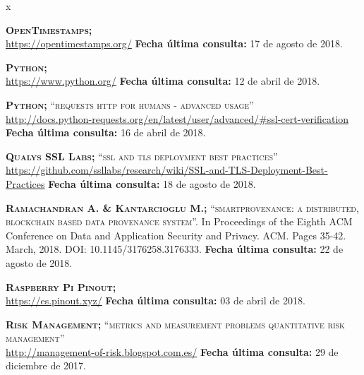 \begin{thebibliography} {x}

	 \textsc{\textbf{OpenTimestamps; }} \\ 
	\url{https://opentimestamps.org/} 
	\newline \textbf{Fecha última consulta:} 17 de agosto de 2018.		
		
	 \textsc{\textbf{Python; }} \\ 
	\url{https://www.python.org/}
	\newline \textbf{Fecha última consulta:} 12 de abril de 2018.
		
	 \textsc{\textbf{Python; }}\textsc{“requests http for humans - advanced usage”} \\ 
	\url{http://docs.python-requests.org/en/latest/user/advanced/#ssl-cert-verification}
	\newline \textbf{Fecha última consulta:} 16 de abril de 2018.
	
	 \textsc{\textbf{Qualys SSL Labs; }}\textsc{“ssl and tls deployment best practices”} \\
	\url{https://github.com/ssllabs/research/wiki/SSL-and-TLS-Deployment-Best-Practices}
	\newline \textbf{Fecha última consulta:} 18 de agosto de 2018.
		
	 \textsc{\textbf{Ramachandran A. \& Kantarcioglu M.; }} \textsc{“smartprovenance: a distributed, blockchain based data provenance system”.} In Proceedings of the Eighth ACM Conference on Data and Application Security and Privacy. ACM. Pages 35-42. March, 2018. DOI: 10.1145/3176258.3176333.
	\newline \textbf{Fecha última consulta:} 22 de agosto de 2018.
	
	 \textsc{\textbf{Raspberry Pi Pinout; }} \\ 
	\url{https://es.pinout.xyz/}
	\newline \textbf{Fecha última consulta:} 03 de abril de 2018.
	
	 \textsc{\textbf{Risk Management; }}\textsc{“metrics and measurement problems quantitative risk management”} \\
	\url{http://management-of-risk.blogspot.com.es/}
	\newline \textbf{Fecha última consulta:} 29 de diciembre de 2017.
				

\end{thebibliography}

